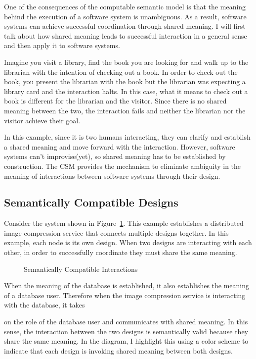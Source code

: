 One of the consequences of the computable semantic model is that the meaning behind the execution of a software system is unambiguous. As a result, software systems can achieve successful coordination through shared meaning. I will first talk about how shared meaning leads to successful interaction in a general sense and then apply it to software systems.

Imagine you visit a library, find the book you are looking for and walk up to the librarian with the intention of checking out a book. In order to check out the book, you present the librarian with the book but the librarian was expecting a library card and the interaction halts. In this case, what it means to check out a book is different for the librarian and the visitor. Since there is no shared meaning between the two, the interaction fails and neither the librarian nor the visitor achieve their goal.

In this example, since it is two humans interacting, they can clarify and establish a shared meaning and move forward with the interaction. However, software systems can't improvise(yet), so shared meaning has to be established by construction. The CSM provides the mechanism to eliminate ambiguity in the meaning of interactions between software systems through their design.

\subsection{Semantically Compatible Designs}

Consider the system shown in Figure~\ref{fig:semantically_compatible_interactions}. This example establishes a distributed image compression service that connects multiple designs together. In this example, each node is its own design. When two designs are interacting with each other, in order to successfully coordinate they must share the same meaning.

\begin{figure}[htbp]
    
    \caption{Semantically Compatible Interactions}
    \label{fig:semantically_compatible_interactions}
\end{figure}

When the meaning of the database is established, it also establishes the meaning of a database user. Therefore when the image compression service is interacting with the database, it takes

on the role of the database user and communicates with shared meaning. In this sense, the interaction between the two designs is semantically valid because they share the same meaning. In the diagram, I highlight this using a color scheme to indicate that each design is invoking shared meaning between both designs.

